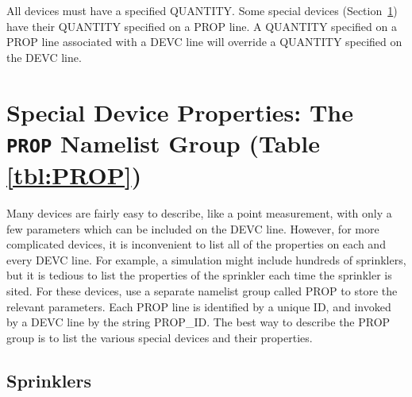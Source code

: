 \documentclass[11pt]{book}
\begin{document}
All devices must have a specified {\ct QUANTITY}.  Some special devices (Section~\ref{info:PROP}) have their {\ct QUANTITY}
specified on a {\ct PROP} line.
A {\ct QUANTITY} specified on a {\ct PROP} line associated with a {\ct DEVC} line will override a {\ct QUANTITY}
specified on the {\ct DEVC} line.



\newpage

\section{Special Device Properties: The \texorpdfstring{{\tt PROP}}{PROP} Namelist Group (Table \ref{tbl:PROP})}
\label{info:PROP}

Many devices are fairly easy to describe, like a point measurement, with only a few parameters which can be included on the
{\ct DEVC} line. However, for more complicated devices, it is inconvenient to list all of the properties on each and every
{\ct DEVC} line. For example, a simulation might include hundreds of sprinklers, but it is tedious to list the properties of the
sprinkler each time the sprinkler is sited. For these devices, use a separate namelist group called {\ct PROP} to store the relevant parameters.
Each {\ct PROP} line is identified by a unique {\ct ID}, and invoked by a {\ct DEVC} line by the string {\ct PROP\_ID}.
The best way to describe the {\ct PROP} group is to list the various special devices and their properties.


\subsection{Sprinklers}
\label{info:sprinklers}
\end{document}
